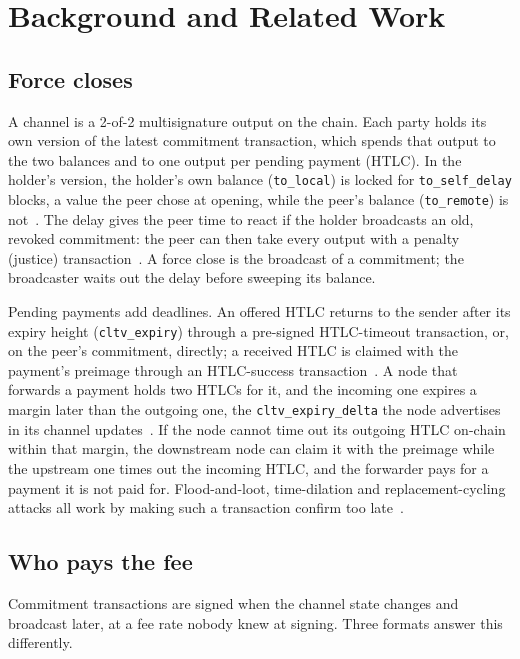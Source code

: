\section{Background and Related Work}
\label{sec:background}

\subsection{Force closes}
A channel is a 2-of-2 multisignature output on the chain. Each party holds its own version of the latest commitment
transaction, which spends that output to the two balances and to one output per pending payment (HTLC). In the
holder's version, the holder's own balance (\texttt{to\_local}) is locked for \texttt{to\_self\_delay} blocks, a value
the peer chose at opening, while the peer's balance (\texttt{to\_remote}) is not~\cite{bolt3}. The delay gives the peer
time to react if the holder broadcasts an old, revoked commitment: the peer can then take every output with a penalty
(justice) transaction~\cite{poon2016bitcoin}. A force close is the broadcast of a commitment; the broadcaster waits out
the delay before sweeping its balance.

Pending payments add deadlines. An offered HTLC returns to the sender after its expiry height
(\texttt{cltv\_expiry}) through a pre-signed HTLC-timeout transaction, or, on the peer's commitment, directly; a
received HTLC is claimed with the payment's preimage through an HTLC-success transaction~\cite{bolt3,bolt5}. A node
that forwards a payment holds two HTLCs for it, and the incoming one expires a margin later than the outgoing one,
the \texttt{cltv\_expiry\_delta} the node advertises in its channel updates~\cite{bolt7}. If the node cannot time out
its outgoing HTLC on-chain within that margin, the downstream node can claim it with the preimage while the
upstream one times out the incoming HTLC, and the forwarder pays for a payment it is not paid for. Flood-and-loot,
time-dilation and replacement-cycling attacks all work by making such a transaction confirm too
late~\cite{harris2020flood,riard2020timedilation,riard2023replacement}.

\subsection{Who pays the fee}
Commitment transactions are signed when the channel state changes and broadcast later, at a fee rate nobody knew at
signing. Three formats answer this differently.

